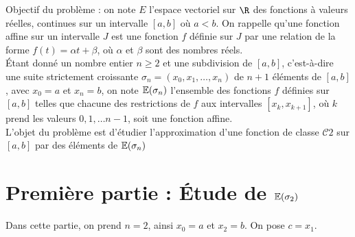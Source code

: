 \documentclass[11pt]{article}%
\begin{document}
{Objectif du problème :} on note $E$ l'espace vectoriel sur $\R$ des
fonctions à valeurs réelles, continues sur un intervalle $[a,b]$ où
$a<b$.
On rappelle qu'une fonction affine sur un intervalle $J$ est une
fonction $f$
définie sur $J$ par une relation de la forme $f(t) = \alpha t + \beta
$, où $\alpha $ et $\beta $ sont des nombres réels.\\
Étant donné un nombre entier $n\geq 2$ et une subdivision de $[a,b]$,
c'est-à-dire une suite strictement croissante $\sigma
_{n} = (x_{0},x_{1},\ldots,x_{n})$ de $n + 1$ éléments de $[a,b]$, avec
$x_{0} = a
$ et $x_{n} = b$, on note $\mathbb{E}(\sigma_{n})$ l'ensemble des fonctions $f$
définies sur $[a,b]$ telles que chacune des restrictions de $f$ aux
intervalles $[x_{k},x_{k + 1}]$, où $k$ prend les valeurs $0,1,\ldots
n-1$,
soit une fonction affine.\\
L'objet du problème est d'étudier l'approximation d'une fonction de
classe $\mathcal{C}{2}$ sur $[a,b]$ par des éléments de
$\mathbb{E}(\sigma_{n})$

\section*{Première partie : {\protect\Large Étude de
$\mathbb{E}(\protect\sigma_{2})$}}

Dans cette partie, on prend $n = 2$, ainsi $x_{0} = a$ et $x_{2} = b$.
On pose $c = x_{1}$.
\end{document}
